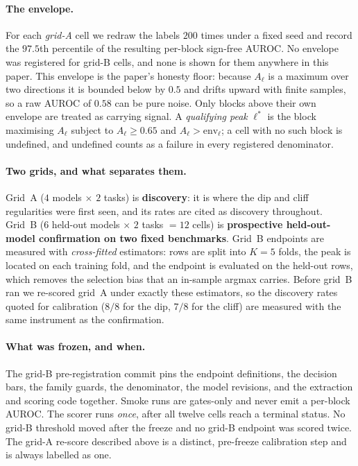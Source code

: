\documentclass[10pt, letterpaper]{article}
\begin{document}
\paragraph{The envelope.} For each \emph{grid-A} cell we redraw the labels $200$
times under a fixed seed and record the $97.5$th percentile of the resulting
per-block sign-free AUROC. No envelope was registered for grid-B cells, and none
is shown for them anywhere in this paper. This envelope is the paper's honesty floor: because $A_\ell$ is
a maximum over two directions it is bounded below by $0.5$ and drifts upward with
finite samples, so a raw AUROC of $0.58$ can be pure noise. Only blocks above
their own envelope are treated as carrying signal. A \emph{qualifying peak}
$\ell^*$ is the block maximising $A_\ell$ subject to $A_\ell \geq 0.65$ and
$A_\ell > \mathrm{env}_\ell$; a cell with no such block is undefined, and
undefined counts as a failure in every registered denominator.

\paragraph{Two grids, and what separates them.} Grid~A ($4$ models $\times$ $2$
tasks) is \textbf{discovery}: it is where the dip and cliff regularities were
first seen, and its rates are cited as discovery throughout. Grid~B ($6$
held-out models $\times$ $2$ tasks $=12$ cells) is \textbf{prospective
held-out-model confirmation on two fixed benchmarks}. Grid~B endpoints are
measured with \emph{cross-fitted} estimators: rows are split into $K=5$ folds,
the peak is located on each training fold, and the endpoint is evaluated on the
held-out rows, which removes the selection bias that an in-sample argmax carries.
Before grid~B ran we re-scored grid~A under exactly these estimators, so the
discovery rates quoted for calibration ($8/8$ for the dip, $7/8$ for the cliff)
are measured with the same instrument as the confirmation.

\paragraph{What was frozen, and when.} The grid-B pre-registration commit pins
the endpoint definitions, the decision bars, the family guards, the denominator,
the model revisions, and the extraction and scoring code together. Smoke runs are
gates-only and never emit a per-block AUROC. The scorer runs \emph{once}, after
all twelve cells reach a terminal status. No grid-B threshold moved after the
freeze and no grid-B endpoint was scored twice. The grid-A re-score described
above is a distinct, pre-freeze calibration step and is always labelled as one.
\end{document}
